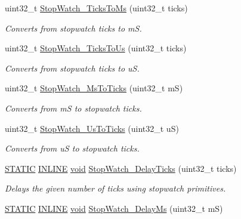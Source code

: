 \begin{DoxyCompactItemize}
uint32\-\_\-t \hyperlink{group__Stop__Watch_gab62ee68f7b01b5c14b0d19c3c391ca02}{Stop\-Watch\-\_\-\-Ticks\-To\-Ms} (uint32\-\_\-t ticks)
\begin{DoxyCompactList}\small\item\em Converts from stopwatch ticks to m\-S. \end{DoxyCompactList}\item 
uint32\-\_\-t \hyperlink{group__Stop__Watch_ga76fc3c7b473615677932efe3e5d0e142}{Stop\-Watch\-\_\-\-Ticks\-To\-Us} (uint32\-\_\-t ticks)
\begin{DoxyCompactList}\small\item\em Converts from stopwatch ticks to u\-S. \end{DoxyCompactList}\item 
uint32\-\_\-t \hyperlink{group__Stop__Watch_ga00f0c8411acd07344c7dd3cac8ec6d3e}{Stop\-Watch\-\_\-\-Ms\-To\-Ticks} (uint32\-\_\-t m\-S)
\begin{DoxyCompactList}\small\item\em Converts from m\-S to stopwatch ticks. \end{DoxyCompactList}\item 
uint32\-\_\-t \hyperlink{group__Stop__Watch_ga65ab3801fdb76aab8879a0698fc4df45}{Stop\-Watch\-\_\-\-Us\-To\-Ticks} (uint32\-\_\-t u\-S)
\begin{DoxyCompactList}\small\item\em Converts from u\-S to stopwatch ticks. \end{DoxyCompactList}\item 
\hyperlink{group__LPC__Types__Public__Macros_ga10b2d890d871e1489bb02b7e70d9bdfb}{S\-T\-A\-T\-I\-C} \hyperlink{group__LPC__Types__Public__Types_ga2eb6f9e0395b47b8d5e3eeae4fe0c116}{I\-N\-L\-I\-N\-E} \hyperlink{Paradigm_2Tern__EE_2small_2portmacro_8h_a14d32f8130d3c0b212cfc751730b5b49}{void} \hyperlink{group__Stop__Watch_ga744f358982209fe277eb21843e88a2d9}{Stop\-Watch\-\_\-\-Delay\-Ticks} (uint32\-\_\-t ticks)
\begin{DoxyCompactList}\small\item\em Delays the given number of ticks using stopwatch primitives. \end{DoxyCompactList}\item 
\hyperlink{group__LPC__Types__Public__Macros_ga10b2d890d871e1489bb02b7e70d9bdfb}{S\-T\-A\-T\-I\-C} \hyperlink{group__LPC__Types__Public__Types_ga2eb6f9e0395b47b8d5e3eeae4fe0c116}{I\-N\-L\-I\-N\-E} \hyperlink{Paradigm_2Tern__EE_2small_2portmacro_8h_a14d32f8130d3c0b212cfc751730b5b49}{void} \hyperlink{group__Stop__Watch_gaa3bfba465962b310e4a5bd18292e8f87}{Stop\-Watch\-\_\-\-Delay\-Ms} (uint32\-\_\-t m\-S)

\end{DoxyCompactItemize}
